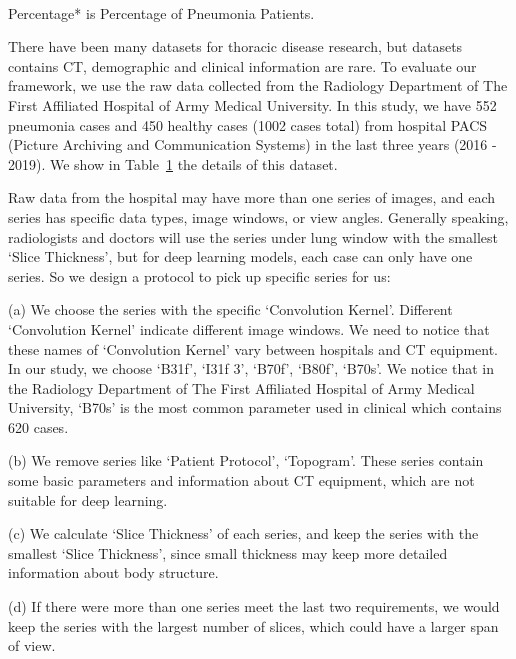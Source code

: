 \documentclass[journal]{IEEEtran}
\begin{document}
\begin{table}[htbp]
\begin{center}
\begin{tabular}{c|c|c|c|c}
    \hline
    \end{tabular}
    \vspace{0.1cm}
 \\
    \footnotesize{Percentage* is Percentage of Pneumonia Patients. }

    \end{center}
    \label{malefemale}

    \vspace{-0.0cm}
    \end{table}
There have been many datasets for thoracic disease research, but datasets contains CT, demographic and clinical information are rare.
To evaluate our framework, we use the raw data collected from the Radiology Department of The First Affiliated Hospital of Army Medical University. In this study, we have 552 pneumonia cases and 450 healthy cases (1002 cases total) from hospital PACS (Picture Archiving and Communication Systems) in the last three years (2016 - 2019). We show in Table~\ref{malefemale} the details of this dataset. 

Raw data from the hospital may have more than one series of images, and each series has specific data types, image windows, or view angles. 
Generally speaking, radiologists and doctors will use the series under lung window with the smallest `Slice Thickness', but for deep learning models, each case can only have one series. So we design a protocol to pick up specific series for us:

(a) We choose the series with the specific `Convolution Kernel'. Different `Convolution Kernel' indicate different image windows. We need to notice that these names of `Convolution Kernel' vary between hospitals and CT equipment. In our study, we choose `B31f', `I31f 3', `B70f', `B80f', `B70s'. We notice that in the Radiology Department of The First Affiliated Hospital of Army Medical University, `B70s' is the most common parameter used in clinical which contains 620 cases.

(b) We remove series like `Patient Protocol', `Topogram'. These series contain some basic parameters and information about CT equipment, which are not suitable for deep learning.

(c) We calculate `Slice Thickness' of each series, and keep the series with the smallest `Slice Thickness', since small thickness may keep more detailed information about body structure. 

(d) If there were more than one series meet the last two requirements, we would keep the series with the largest number of slices, which could have a larger span of view.
\end{document}
